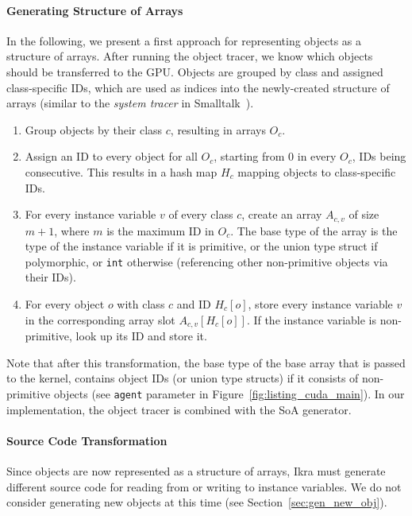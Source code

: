 \documentclass[preprint]{sigplanconf}
\begin{document}
\paragraph{Generating Structure of Arrays}
In the following, we present a first approach for representing objects as a structure of arrays. After running the object tracer, we know which objects should be transferred to the GPU. Objects are grouped by class and assigned class-specific IDs, which are used as indices into the newly-created structure of arrays (similar to the \emph{system tracer} in Smalltalk~\cite{Krasner:1983:SBH:226}).

\begin{enumerate}
    \item Group objects by their class $c$, resulting in arrays $O_c$.
    \item Assign an ID to every object for all $O_c$, starting from $0$ in every $O_c$, IDs being consecutive. This results in a hash map $H_c$ mapping objects to class-specific IDs.
    \item For every instance variable $v$ of every class $c$, create an array $A_{c,v}$ of size $m + 1$, where $m$ is the maximum ID in $O_c$. The base type of the array is the type of the instance variable if it is primitive, or the union type struct if polymorphic, or \texttt{int} otherwise (referencing other non-primitive objects via their IDs).
    \item For every object $o$ with class $c$ and ID $H_c[o]$, store every instance variable $v$ in the corresponding array slot $A_{c, v}[H_c[o]]$. If the instance variable is non-primitive, look up its ID and store it.
\end{enumerate}

Note that after this transformation, the base type of the base array that is passed to the kernel, contains object IDs (or union type structs) if it consists of non-primitive objects (see \texttt{agent} parameter in Figure~\ref{fig:listing_cuda_main}). In our implementation, the object tracer is combined with the SoA generator.

\paragraph{Source Code Transformation}
Since objects are now represented as a structure of arrays, Ikra must generate different source code for reading from or writing to instance variables. We do not consider generating new objects at this time (see Section~\ref{sec:gen_new_obj}).
\end{document}
